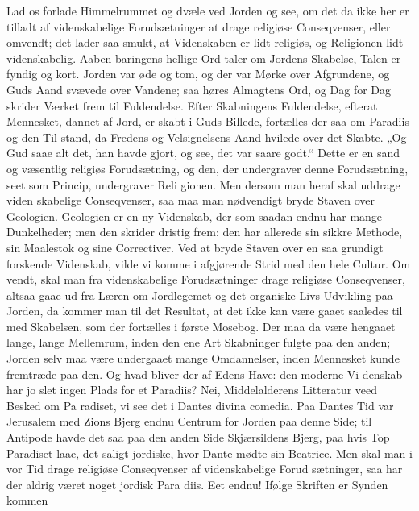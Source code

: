\documentclass[12pt]{book}
\newcommand{\opage}[1]{\marginnote{\footnotesize\textit{[#1]}}}
\begin{document}
Lad os forlade Himmelrummet og dvæle ved Jorden
og see, om det da ikke her er tilladt af videnskabelige
Forudsætninger at drage religiøse Conseqvenser, eller
omvendt; det lader saa smukt, at Videnskaben er
lidt religiøs, og Religionen lidt videnskabelig. Aaben\-%
baringens hellige Ord taler om Jordens Skabelse, Talen
er fyndig og kort. Jorden var øde og tom, og der var
Mørke over Afgrundene, og Guds Aand svævede over
Vandene; saa høres Almagtens Ord, og Dag for Dag
skrider Værket frem til Fuldendelse. Efter Skabningens
Fuldendelse, efterat Mennesket, dannet af Jord, er skabt i
Guds Billede, fortælles der saa om Paradiis og den Til\-%
stand, da Fredens og Velsignelsens Aand hvilede over
det Skabte. „Og Gud saae alt det, han havde gjort, og
see, det var saare godt.“ Dette er en sand og væsentlig
religiøs Forudsætning, og den, der undergraver denne
Forudsætning, seet som Princip, undergraver Reli\-%
\opage{69}\setcounter{footnote}{0}%
gionen. Men dersom man heraf skal uddrage viden\-%
skabelige Conseqvenser, saa maa man nødvendigt bryde
Staven over Geologien. Geologien er en ny Videnskab,
der som saadan endnu har mange Dunkelheder; men den
skrider dristig frem: den har allerede sin sikkre Methode,
sin Maalestok og sine Correctiver. Ved at bryde Staven
over en saa grundigt forskende Videnskab, vilde vi
komme i afgjørende Strid med den hele Cultur. Om\-%
vendt, skal man fra videnskabelige Forudsætninger drage
religiøse Conseqvenser, altsaa gaae ud fra Læren om
Jordlegemet og det organiske Livs Udvikling paa
Jorden, da kommer man til det Resultat, at det ikke
kan være gaaet saaledes til med Skabelsen, som der fortælles
i første Mosebog. Der maa da være hengaaet lange,
lange Mellemrum, inden den ene Art Skabninger fulgte
paa den anden; Jorden selv maa være undergaaet mange
Omdannelser, inden Mennesket kunde fremtræde paa den.
Og hvad bliver der af Edens Have: den moderne Vi\-%
denskab har jo slet ingen Plads for et Paradiis?
Nei, Middelalderens Litteratur veed Besked om Pa\-%
radiset, vi see det i Dantes divina comedia. Paa
Dantes Tid var Jerusalem med Zions Bjerg endnu
Centrum for Jorden paa denne Side; til Antipode havde
det saa paa den anden Side Skjærsildens Bjerg, paa
hvis Top Paradiset laae, det saligt jordiske, hvor
Dante mødte sin Beatrice. Men skal man i vor Tid
drage religiøse Conseqvenser af videnskabelige Forud\-%
sætninger, saa har der aldrig været noget jordisk Para\-%
diis. Eet endnu! Ifølge Skriften er Synden kommen
\end{document}
